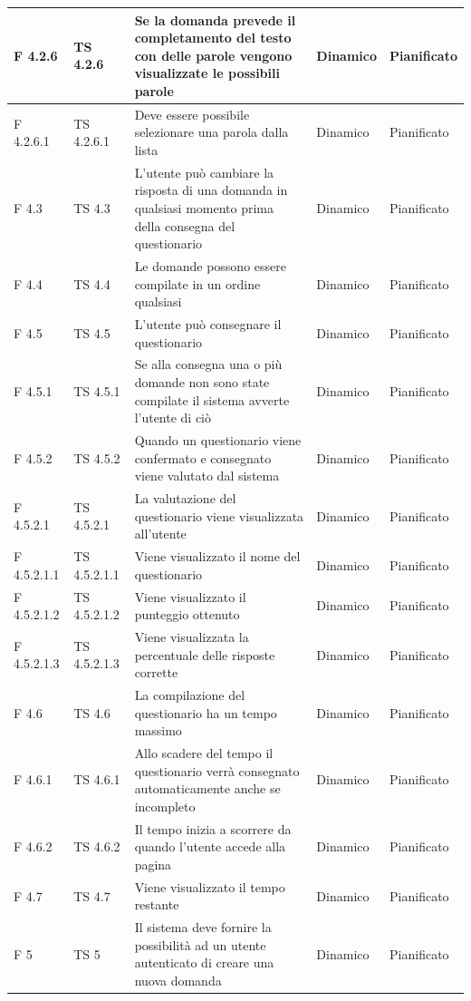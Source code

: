 \documentclass[a4paper,11pt]{article}
\begin{document}
\begin{longtable}{p{}p{}p{}p{}p{}}
\midrule
F 4.2.6 & TS 4.2.6 &Se la domanda prevede il completamento del testo con delle parole vengono visualizzate le possibili parole & Dinamico &Pianificato\\
\midrule
F 4.2.6.1 & TS 4.2.6.1 &Deve essere possibile selezionare una parola dalla lista & Dinamico &Pianificato\\
\midrule
F 4.3 & TS 4.3&L'utente può cambiare la risposta di una domanda in qualsiasi momento prima della consegna del questionario & Dinamico &Pianificato\\
\midrule
F 4.4 & TS 4.4 &Le domande possono essere compilate in un ordine qualsiasi & Dinamico &Pianificato\\
\midrule
F 4.5 &TS 4.5 &L'utente può consegnare il questionario & Dinamico &Pianificato\\
\midrule
F 4.5.1 & TS 4.5.1 &Se alla consegna una o più domande non sono state compilate il sistema avverte l'utente di ciò & Dinamico &Pianificato\\
\midrule
F 4.5.2 & TS 4.5.2 &Quando un questionario viene confermato e consegnato viene valutato dal sistema & Dinamico &Pianificato\\
\midrule
F 4.5.2.1 & TS 4.5.2.1 &La valutazione del questionario viene visualizzata all'utente & Dinamico &Pianificato\\
\midrule
F 4.5.2.1.1 &TS 4.5.2.1.1 &Viene visualizzato il nome del questionario & Dinamico &Pianificato\\
\midrule
F 4.5.2.1.2 & TS 4.5.2.1.2 &Viene visualizzato il punteggio ottenuto & Dinamico &Pianificato\\
\midrule
F 4.5.2.1.3 & TS 4.5.2.1.3 &Viene visualizzata la percentuale delle risposte corrette & Dinamico &Pianificato\\
\midrule
F 4.6 & TS 4.6&La compilazione del questionario ha un tempo massimo & Dinamico &Pianificato\\
\midrule
F 4.6.1 & TS 4.6.1 &Allo scadere del tempo il questionario verrà consegnato automaticamente anche se incompleto & Dinamico &Pianificato\\
\midrule
F 4.6.2 & TS 4.6.2 &Il tempo inizia a scorrere da quando l'utente accede alla pagina & Dinamico &Pianificato\\
\midrule
F 4.7 &TS 4.7 &Viene visualizzato il tempo restante & Dinamico &Pianificato\\
\midrule
F 5 & TS 5&Il sistema deve fornire la possibilità ad un utente autenticato di creare una nuova domanda & Dinamico &Pianificato\\

\end{longtable}
\end{document}

